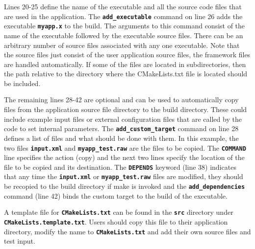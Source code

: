 Lines 20-25 define the name of the executable and all the source code files that are used in the application. The \texttt{\textbf{add\_executable}} command on line 26 adds the executable \texttt{\textbf{myapp.x}} to the build. The arguments to this command consist of the name of the executable followed by the executable source files. There can be an arbitrary number of source files associated with any one executable. Note that the source files just consist of the user application source files, the framework files are handled automatically. If some of the files are located in subdirectories, then the path relative to the directory where the CMakeLists.txt file is located should be included.

The remaining lines 28-42 are optional and can be used to automatically copy files from the application source file directory to the build directory. These could include example input files or external configuration files that are called by the code to set internal parameters. The \texttt{\textbf{add\_custom\_target}} command on line 28 defines a list of files and what should be done with them. In this example, the two files \texttt{\textbf{input.xml}} and \texttt{\textbf{myapp\_test.raw}} are the files to be copied. The \texttt{\textbf{COMMAND}} line specifies the action (copy) and the next two lines specify the location of the file to be copied and its destination. The \texttt{\textbf{DEPENDS}} keyword (line 38) indicates that any time the \texttt{\textbf{input.xml}} or \texttt{\textbf{myapp\_test.raw}} files are modified, they should be recopied to the build directory if make is invoked and the \texttt{\textbf{add\_dependencies}} command (line 42) binds the custom target to the build of the executable.

A template file for \texttt{\textbf{CMakeLists.txt}} can be found in the \texttt{\textbf{src}} directory under \texttt{\textbf{CMakeLists.template.txt}}. Users should copy this file to their application directory, modify the name to \texttt{\textbf{CMakeLists.txt}} and add their own source files and test input.

